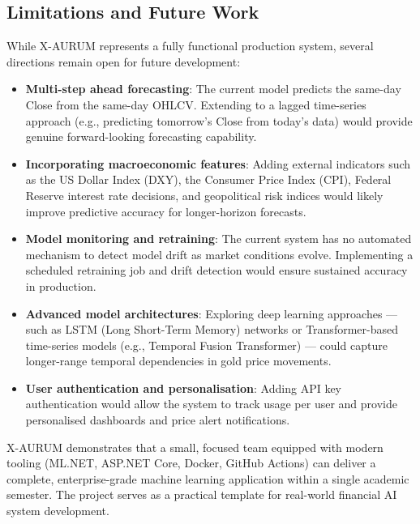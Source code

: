 \subsection*{Limitations and Future Work}

While X-AURUM represents a fully functional production system, several directions remain open for future development:

\begin{itemize}
  \item \textbf{Multi-step ahead forecasting}: The current model predicts the same-day Close from the same-day OHLCV. Extending to a lagged time-series approach (e.g., predicting tomorrow's Close from today's data) would provide genuine forward-looking forecasting capability.

  \item \textbf{Incorporating macroeconomic features}: Adding external indicators such as the US Dollar Index (DXY), the Consumer Price Index (CPI), Federal Reserve interest rate decisions, and geopolitical risk indices would likely improve predictive accuracy for longer-horizon forecasts.

  \item \textbf{Model monitoring and retraining}: The current system has no automated mechanism to detect model drift as market conditions evolve. Implementing a scheduled retraining job and drift detection would ensure sustained accuracy in production.

  \item \textbf{Advanced model architectures}: Exploring deep learning approaches --- such as LSTM (Long Short-Term Memory) networks or Transformer-based time-series models (e.g., Temporal Fusion Transformer) --- could capture longer-range temporal dependencies in gold price movements.

  \item \textbf{User authentication and personalisation}: Adding API key authentication would allow the system to track usage per user and provide personalised dashboards and price alert notifications.
\end{itemize}

X-AURUM demonstrates that a small, focused team equipped with modern tooling (ML.NET, ASP.NET Core, Docker, GitHub Actions) can deliver a complete, enterprise-grade machine learning application within a single academic semester. The project serves as a practical template for real-world financial AI system development.

\newpage
